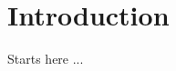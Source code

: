 \documentclass[12pt]{book}
\begin{document}
\chapter{Introduction}

Starts here ...




\printindex
\end{document}
